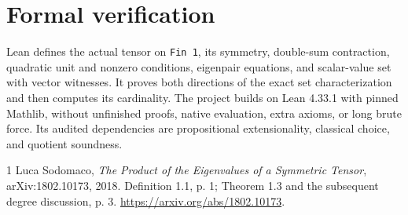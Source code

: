\documentclass[10pt]{article}
\begin{document}
\section*{Formal verification}
Lean defines the actual tensor on \texttt{Fin 1}, its symmetry, double-sum
contraction, quadratic unit and nonzero conditions, eigenpair equations,
and scalar-value set with vector witnesses. It proves both directions of
the exact set characterization and then computes its cardinality.
The project builds on Lean 4.33.1 with pinned Mathlib, without unfinished
proofs, native evaluation, extra axioms, or long brute force. Its audited
dependencies are propositional extensionality, classical choice, and
quotient soundness.

\begin{thebibliography}{1}
 Luca Sodomaco, \emph{The Product of the Eigenvalues of a
Symmetric Tensor}, arXiv:1802.10173, 2018. Definition 1.1, p. 1;
Theorem 1.3 and the subsequent degree discussion, p. 3.
\url{https://arxiv.org/abs/1802.10173}.
\end{thebibliography}
\end{document}
